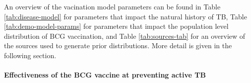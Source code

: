\documentclass[11pt,twoside]{bristolthesis}
\begin{document}
  An overview of the vacination model parameters can be found in Table \ref{tab:disease-model} for parameters that impact the natural history of TB, Table \ref{tab:demo-model-params} for parameters that impact the population level distribution of BCG vaccination, and Table \ref{tab:sources-tab} for an overview of the sources used to generate prior distributions. More detail is given in the following section.
  
  \hypertarget{effectiveness-of-the-bcg-vaccine-at-preventing-active-tb}{%
  \paragraph{Effectiveness of the BCG vaccine at preventing active TB}\label{effectiveness-of-the-bcg-vaccine-at-preventing-active-tb}}
  
\end{document}
